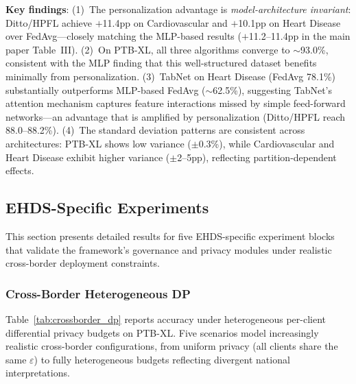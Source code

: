 \documentclass[conference]{IEEEtran}
\begin{document}
\textbf{Key findings}: (1)~The personalization advantage is \textit{model-architecture invariant}: Ditto/HPFL achieve $+$11.4pp on Cardiovascular and $+$10.1pp on Heart Disease over FedAvg---closely matching the MLP-based results ($+$11.2--11.4pp in the main paper Table~III). (2)~On PTB-XL, all three algorithms converge to $\sim$93.0\%, consistent with the MLP finding that this well-structured dataset benefits minimally from personalization. (3)~TabNet on Heart Disease (FedAvg 78.1\%) substantially outperforms MLP-based FedAvg ($\sim$62.5\%), suggesting TabNet's attention mechanism captures feature interactions missed by simple feed-forward networks---an advantage that is amplified by personalization (Ditto/HPFL reach 88.0--88.2\%). (4)~The standard deviation patterns are consistent across architectures: PTB-XL shows low variance ($\pm$0.3\%), while Cardiovascular and Heart Disease exhibit higher variance ($\pm$2--5pp), reflecting partition-dependent effects.

\subsection{EHDS-Specific Experiments}
\label{sec:ehds_experiments}

This section presents detailed results for five EHDS-specific experiment blocks that validate the framework's governance and privacy modules under realistic cross-border deployment constraints.

\subsubsection{Cross-Border Heterogeneous DP}
\label{sec:crossborder_dp}

Table~\ref{tab:crossborder_dp} reports accuracy under heterogeneous per-client differential privacy budgets on PTB-XL. Five scenarios model increasingly realistic cross-border configurations, from uniform privacy (all clients share the same $\varepsilon$) to fully heterogeneous budgets reflecting divergent national interpretations.
\end{document}
